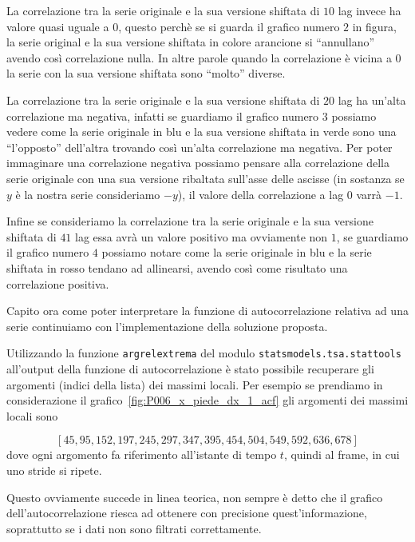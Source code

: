 La correlazione tra la serie originale e la sua versione shiftata di $10$ lag invece ha valore
quasi uguale a $0$, questo perchè se si guarda il grafico numero $2$ in figura, la serie 
original e la sua versione shiftata in colore arancione si ``annullano'' avendo così correlazione
nulla. In altre parole quando la correlazione è vicina a $0$ la serie con la sua versione shiftata
sono ``molto'' diverse.

La correlazione tra la serie originale e la sua versione shiftata di $20$ lag ha un'alta correlazione
ma negativa, infatti se guardiamo il grafico numero $3$ possiamo vedere come la serie originale in blu
e la sua versione shiftata in verde sono una ``l'opposto'' dell'altra trovando così un'alta correlazione
ma negativa. Per poter immaginare una correlazione negativa possiamo pensare alla correlazione della serie
originale con una sua versione ribaltata sull'asse delle ascisse (in sostanza se $y$ è la nostra serie consideriamo $-y$),
il valore della correlazione a lag $0$ varrà $-1$.

Infine se consideriamo la correlazione tra la serie originale e la sua versione shiftata di $41$ lag
essa avrà un valore positivo ma ovviamente non $1$, se guardiamo il grafico numero $4$ possiamo notare
come la serie originale in blu e la serie shiftata in rosso tendano ad allinearsi, avendo così
come risultato una correlazione positiva.

Capito ora come poter interpretare la funzione di autocorrelazione relativa ad una serie 
continuiamo con l'implementazione della soluzione proposta.

\begin{sloppypar}
Utilizzando la funzione \texttt{argrelextrema} del modulo \texttt{statsmodels.tsa.stattools}
all'output della funzione di autocorrelazione è stato possibile recuperare gli argomenti (indici della lista) dei massimi locali.
Per esempio se prendiamo in considerazione il grafico~\ref{fig:P006_x_piede_dx_1_acf} gli argomenti
dei massimi locali sono
\end{sloppypar}
\[ [45, 95, 152, 197, 245, 297, 347, 395, 454, 504, 549, 592, 636, 678] \]
dove ogni argomento fa riferimento all'istante di tempo $t$, quindi al frame, in cui uno stride si ripete.

\begin{sloppypar}
Questo ovviamente succede in linea teorica, non sempre è detto che il grafico dell'autocorrelazione
riesca ad ottenere con precisione quest'informazione, soprattutto se i dati non sono filtrati correttamente.
\end{sloppypar}

